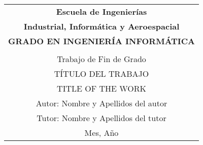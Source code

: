 \thispagestyle{empty}

\begin{table}[ht]
	\centering
	\label{tab:coverTopCenter}
	\begin{tabular}{c}
		\LARGE\textbf{Escuela de Ingenierías}
		\\[1.5ex]

		\LARGE\textbf{Industrial, Informática y Aeroespacial}
		\\[2.3ex]

		\LARGE\textbf{GRADO EN INGENIERÍA INFORMÁTICA}
		\\[10ex]
		\\[10ex]

		\LARGE{Trabajo de Fin de Grado}
		\\[15ex]

		\uppercase{\LARGE{Título del trabajo}}
		\\[5ex]

		\uppercase{\LARGE{Title of the work}}
		\\[30ex]

		\hfill\LARGE{Autor: Nombre y Apellidos del autor}
		\\[6pt]
		\hfill\LARGE{Tutor: Nombre y Apellidos del tutor}
		\\[25ex]

		\huge{Mes, Año}
	\end{tabular}
\end{table}
